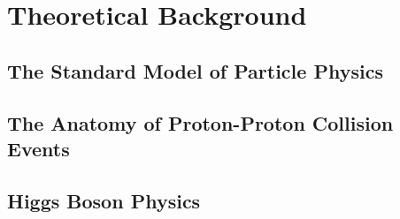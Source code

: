 \chapter{Theoretical Background}
\label{chap:theory}

\section{The Standard Model of Particle Physics}
\section{The Anatomy of Proton-Proton Collision Events}
\section{Higgs Boson Physics}
